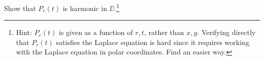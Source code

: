 \documentclass{../math135}
\begin{document}
\begin{exercise}
\begin{problems}
    \begin{solution}
    \end{solution}

  \item Show that \(P_r(t)\) is harmonic in \(\DD\).\footnote{Hint:
      \(P_r(t)\) is given as a function of \(r,t\), rather than
      \(x,y\).  Verifying directly that \(P_r(t)\) satisfies the
      Laplace equation is hard since it requires working with the
      Laplace equation in polar coordinates.  Find an easier way.}

    \begin{solution}
    \end{solution}

	\end{problems}
\end{exercise}
\end{document}
